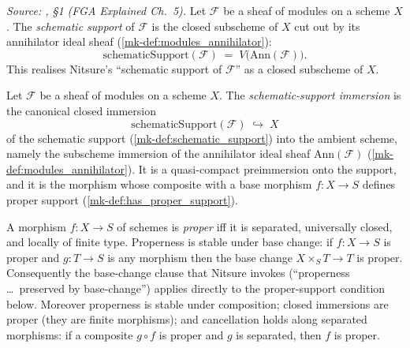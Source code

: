\begin{definition}\label{mk-def:schematic_support}
  \leanok

  \textit{Source: \cite{nitsure-hilbert-quot}, \S 1 (FGA Explained Ch.~5).}
  Let \(\mathcal{F}\) be a sheaf of modules on a scheme \(X\). The
  \emph{schematic support} of \(\mathcal{F}\) is the closed subscheme of \(X\)
  cut out by its annihilator ideal sheaf (\ref{mk-def:modules_annihilator}):
  \[
    \mathrm{schematicSupport}(\mathcal{F})
    \;=\; V\bigl(\mathrm{Ann}(\mathcal{F})\bigr).
  \]
  This realises Nitsure's ``schematic support of \(\mathcal{F}\)'' as a closed
  subscheme of \(X\).
\end{definition}

\begin{definition}\label{mk-def:schematic_support_immersion}
  \leanok

  Let \(\mathcal{F}\) be a sheaf of modules on a scheme \(X\). The
  \emph{schematic-support immersion} is the canonical closed immersion
  \[
    \mathrm{schematicSupport}(\mathcal{F}) \;\hookrightarrow\; X
  \]
  of the schematic support (\ref{mk-def:schematic_support}) into the ambient
  scheme, namely the subscheme immersion of the annihilator ideal sheaf
  \(\mathrm{Ann}(\mathcal{F})\) (\ref{mk-def:modules_annihilator}). It is a
  quasi-compact preimmersion onto the support, and it is the morphism whose
  composite with a base morphism \(f : X \to S\) defines proper support
  (\ref{mk-def:has_proper_support}).
\end{definition}

\begin{lemma}
  \label{mk-lem:isProper_mathlib}
  \mathlibok

  A morphism \(f : X \to S\) of schemes is \emph{proper} iff it is separated,
  universally closed, and locally of finite type. Properness is stable under base
  change: if \(f : X \to S\) is proper and \(g : T \to S\) is any morphism then
  the base change \(X \times_S T \to T\) is proper. Consequently the base-change
  clause that Nitsure invokes (``properness \ldots\ preserved by base-change'')
  applies directly to the proper-support condition below.  Moreover properness
  is stable under composition; closed immersions are proper (they are finite
  morphisms); and cancellation holds along separated morphisms: if a composite
  \(g \circ f\) is proper and \(g\) is separated, then \(f\) is proper.
\end{lemma}

